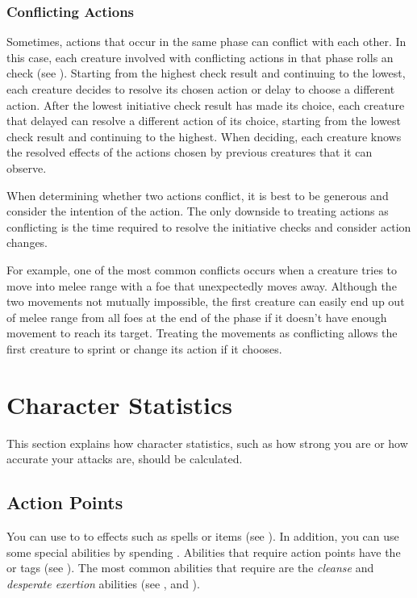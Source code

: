         \subsubsection{Conflicting Actions}\label{Conflicting Actions}

            Sometimes, actions that occur in the same phase can conflict with each other.
            In this case, each creature involved with conflicting actions in that phase rolls an  check (see ).
            Starting from the highest check result and continuing to the lowest, each creature decides to resolve its chosen action or delay to choose a different action.
            After the lowest initiative check result has made its choice, each creature that delayed can resolve a different action of its choice, starting from the lowest check result and continuing to the highest.
            When deciding, each creature knows the resolved effects of the actions chosen by previous creatures that it can observe.

            When determining whether two actions conflict, it is best to be generous and consider the intention of the action.
            The only downside to treating actions as conflicting is the time required to resolve the initiative checks and consider action changes.

            For example, one of the most common conflicts occurs when a creature tries to move into melee range with a foe that unexpectedly moves away.
            Although the two movements not mutually impossible, the first creature can easily end up out of melee range from all foes at the end of the phase if it doesn't have enough movement to reach its target.
            Treating the movements as conflicting allows the first creature to sprint or change its action if it chooses.

\section{Character Statistics}
    This section explains how character statistics, such as how strong you are or how accurate your attacks are, should be calculated.

    \subsection{Action Points}\label{Action Points}
        You can use  to  to effects such as spells or items (see ).
        In addition, you can use some special abilities by spending .
        Abilities that require action points have the  or  tags (see ).
        The most common abilities that require  are the \textit{cleanse} and \textit{desperate exertion} abilities (see , and ).

